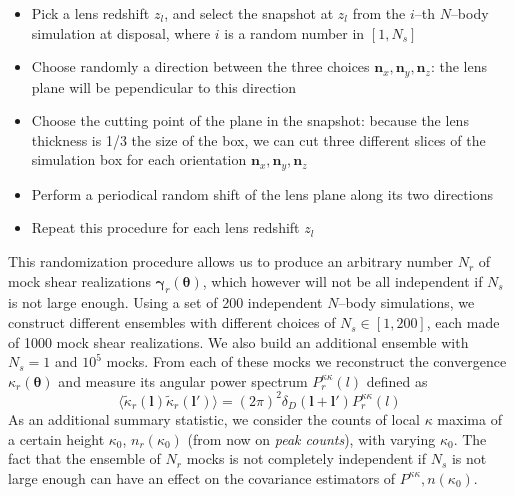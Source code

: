 \documentclass[reprint,aps,prd,superscriptaddress,showkeys,showpacs]{revtex4-1}
\newcommand{\bb}[1]{\mathbf{#1}}
\begin{document}
\begin{itemize}
\item Pick a lens redshift $z_l$, and select the snapshot at $z_l$ from the $i$--th $N$--body simulation at disposal, where $i$ is a random number in $[1,N_s]$
\item Choose randomly a direction between the three choices ${\bb{n}_x,\bb{n}_y,\bb{n}_z}$: the lens plane will be pependicular to this direction
\item Choose the cutting point of the plane in the snapshot: because the lens thickness is 1/3 the size of the box, we can cut three different slices of the simulation box for each orientation ${\bb{n}_x,\bb{n}_y,\bb{n}_z}$
\item Perform a periodical random shift of the lens plane along its two directions
\item Repeat this procedure for each lens redshift $z_l$  
\end{itemize}  
%
This randomization procedure allows us to produce an arbitrary number $N_r$ of mock shear realizations $\pmb{\gamma}_r(\pmb{\theta})$, which however will not be all independent if $N_s$ is not large enough. Using a set of 200 independent $N$--body simulations, we construct different ensembles with different choices of $N_s\in[1,200]$, each made of 1000 mock shear realizations. We also build an additional ensemble with $N_s=1$ and $10^5$ mocks. From each of these mocks we reconstruct the convergence $\kappa_r(\pmb{\theta})$ and measure its angular power spectrum $P^{\kappa\kappa}_r(l)$ defined as
\begin{equation}
\langle\tilde{\kappa}_r(\bb{l})\tilde{\kappa}_r(\bb{l}')\rangle = (2\pi)^2\delta_D(\bb{l}+\bb{l}')P^{\kappa\kappa}_r(l)
\end{equation}
%
As an additional summary statistic, we consider the counts of local $\kappa$ maxima of a certain height $\kappa_0$, $n_r(\kappa_0)$ (from now on \textit{peak counts}), with varying $\kappa_0$. The fact that the ensemble of $N_r$ mocks is not completely independent if $N_s$ is not large enough can have an effect on the covariance estimators of $P^{\kappa\kappa},n(\kappa_0)$. 

\end{document}
